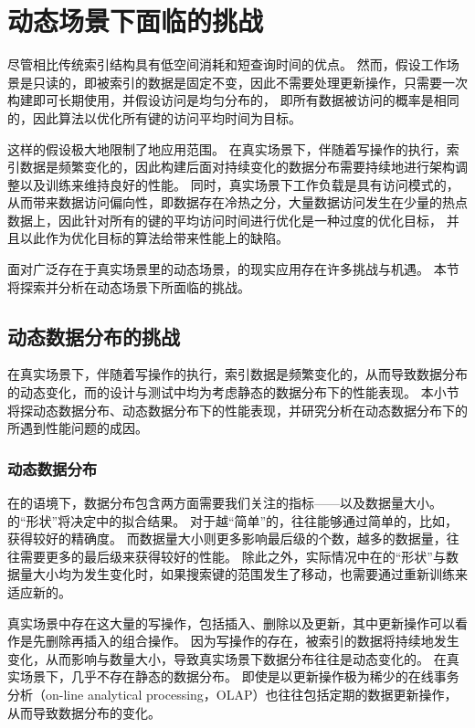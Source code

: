 \chapter{动态场景下{\li}面临的挑战}
\label{chap:challenge}

尽管{\li}相比传统索引结构具有低空间消耗和短查询时间的优点。
然而，{\li}假设工作场景是只读的，即被索引的数据是固定不变，因此不需要处理更新操作，{\li}只需要一次构建即可长期使用，并假设访问是均匀分布的，
即所有数据被访问的概率是相同的，因此{\li}算法以优化所有键的访问平均时间为目标。

这样的假设极大地限制了{\li}地应用范围。
在真实场景下，伴随着写操作的执行，索引数据是频繁变化的，因此{\li}构建后面对持续变化的数据分布需要持续地进行架构调整以及训练来维持良好的{\li}性能。
同时，真实场景下工作负载是具有访问模式的，从而带来数据访问偏向性，即数据存在冷热之分，大量数据访问发生在少量的热点数据上，因此针对所有的键的平均访问时间进行优化是一种过度的优化目标，
并且以此作为优化目标的算法给{\li}带来性能上的缺陷。

面对广泛存在于真实场景里的动态场景，{\li}的现实应用存在许多挑战与机遇。
本节将探索并分析{\li}在动态场景下所面临的挑战。

\section{动态数据分布的挑战}
\label{sec:dist-challenge}

在真实场景下，伴随着写操作的执行，索引数据是频繁变化的，从而导致数据分布的动态变化，而{\li}的设计与测试中均为考虑静态的数据分布下的性能表现。
本小节将探动态数据分布、动态数据分布下{\li}的性能表现，并研究分析{\li}在动态数据分布下的所遇到性能问题的成因。

\subsection{动态数据分布}

在{\li}的语境下，数据分布包含两方面需要我们关注的指标{------}{\cdf}以及数据量大小。
{\cdf}的“形状”将决定{\rmi}中{\model}的拟合结果。
对于越“简单”的{\cdf}，{\rmi}往往能够通过简单的{\model}，比如{\lr}，获得较好的精确度。
而数据量大小则更多影响{\rmi}最后级{\model}的个数，越多的数据量，往往需要更多的{\rmi}最后级{\model}来获得较好的性能。
除此之外，实际情况中在{\cdf}的“形状”与数据量大小均为发生变化时，如果搜索键的范围发生了移动，{\li}也需要通过重新训练来适应新的{\cdf}。

真实场景中存在这大量的写操作，包括插入、删除以及更新，其中更新操作可以看作是先删除再插入的组合操作。
因为写操作的存在，被索引的数据将持续地发生变化，从而影响{\cdf}与数量大小，导致真实场景下数据分布往往是动态变化的。
在真实场景下，几乎不存在静态的数据分布。
即使是以更新操作极为稀少的在线事务分析（on-line analytical processing，OLAP）也往往包括定期的数据更新操作，从而导致数据分布的变化。

